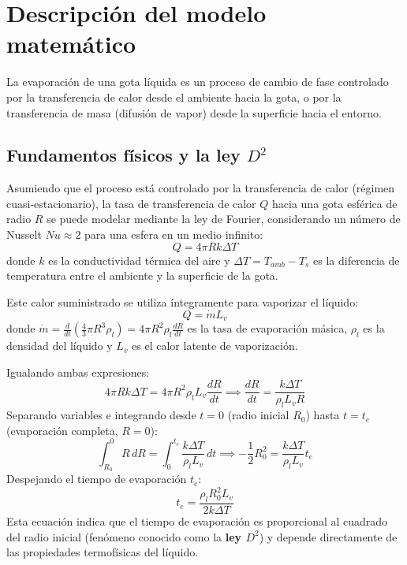 \documentclass[12pt, letterpaper, onecolumn]{article}
\begin{document}
\section{Descripción del modelo matemático}\label{sec:modelo}

La evaporación de una gota líquida es un proceso de cambio de fase controlado por la transferencia de calor desde el ambiente hacia la gota, o por la transferencia de masa (difusión de vapor) desde la superficie hacia el entorno. 

\subsection{Fundamentos físicos y la ley $D^2$}
Asumiendo que el proceso está controlado por la transferencia de calor (régimen cuasi-estacionario), la tasa de transferencia de calor $Q$ hacia una gota esférica de radio $R$ se puede modelar mediante la ley de Fourier, considerando un número de Nusselt $Nu \approx 2$ para una esfera en un medio infinito:
\begin{equation}
Q = 4 \pi R k \Delta T
\end{equation}
donde $k$ es la conductividad térmica del aire y $\Delta T = T_{amb} - T_s$ es la diferencia de temperatura entre el ambiente y la superficie de la gota.

Este calor suministrado se utiliza íntegramente para vaporizar el líquido:
\begin{equation}
Q = \dot{m} L_v
\end{equation}
donde $\dot{m} = \frac{d}{dt}\left(\frac{4}{3}\pi R^3 \rho_l\right) = 4\pi R^2 \rho_l \frac{dR}{dt}$ es la tasa de evaporación másica, $\rho_l$ es la densidad del líquido y $L_v$ es el calor latente de vaporización.

Igualando ambas expresiones:
\begin{equation}
4 \pi R k \Delta T = 4 \pi R^2 \rho_l L_v \frac{dR}{dt} \implies \frac{dR}{dt} = \frac{k \Delta T}{\rho_l L_v R}
\end{equation}
Separando variables e integrando desde $t=0$ (radio inicial $R_0$) hasta $t=t_e$ (evaporación completa, $R=0$):
\begin{equation}
\int_{R_0}^{0} R \, dR = \int_{0}^{t_e} \frac{k \Delta T}{\rho_l L_v} \, dt \implies -\frac{1}{2} R_0^2 = \frac{k \Delta T}{\rho_l L_v} t_e
\end{equation}
Despejando el tiempo de evaporación $t_e$:
\begin{equation}
t_e = \frac{\rho_l R_0^2 L_v}{2 k \Delta T}
\end{equation}
Esta ecuación indica que el tiempo de evaporación es proporcional al cuadrado del radio inicial (fenómeno conocido como la \textbf{ley $D^2$}) y depende directamente de las propiedades termofísicas del líquido.
\end{document}
